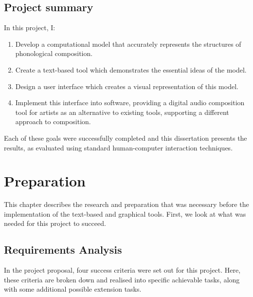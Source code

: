 \documentclass[12pt,a4paper,twoside,openright]{report}
\begin{document}
\section{Project summary}
In this project, I:
\begin{enumerate}
    \item Develop a computational model that accurately represents the structures of phonological composition.
    \item Create a text-based tool which demonstrates the essential ideas of the model.
    \item Design a user interface which creates a visual representation of this model.
    \item Implement this interface into software, providing a digital audio composition tool for artists as an alternative to existing tools, supporting a different approach to composition.
\end{enumerate}

Each of these goals were successfully completed and this dissertation presents the results, as evaluated using standard human-computer interaction techniques.

\chapter{Preparation}
This chapter describes the research and preparation that was necessary before the implementation of the text-based and graphical tools. First, we look at what was needed for this project to succeed.

\section{Requirements Analysis}
In the project proposal, four success criteria were set out for this project. Here, these criteria are broken down and realised into specific achievable tasks, along with some additional possible extension tasks.
\end{document}
